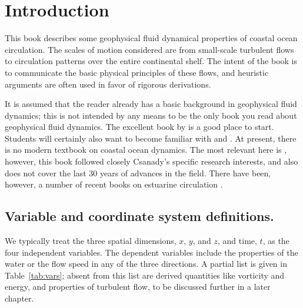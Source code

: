 \documentclass[11pt]{report}
\numberwithin{equation}{section}
\begin{document}
\clearpage

\setcounter{page}{1}

\chapter{Introduction}

This book describes some geophysical fluid dynamical properties of coastal ocean circulation.  The scales of motion considered are from small-scale turbulent flows to circulation patterns over the entire continental shelf.  The intent of the book is to communicate the basic physical principles of these flows, and heuristic arguments are often used in favor of rigorous derivations.

It is assumed that the reader already has a basic background in geophysical fluid dynamics; this is not intended by any means to be the only book you read about geophysical fluid dynamics.  The excellent book by \citet{cushman.beckers:09} is a good place to start.  Students will certainly also want to become familiar with \citet{pedlosky:87} and \citet{gill:82}.  At present, there is no modern textbook on coastal ocean dynamics.  The most relevant here is \citet{csanady:82}, however, this book followed closely Csanady's specific research interests, and also does not cover the last 30 years of advances in the field.  There have been, however, a number of recent books on estuarine circulation \citep{dyer:97, valle-levinson:10}.

\section{Variable and coordinate system definitions.}  

We typically treat the three spatial dimensions, $x$, $y$, and $z$, and time, $t$, as the four independent variables.  The dependent variables include the properties of the water or the flow speed in any of the three directions.  A partial list is given in Table~\ref{tab:vars}; absent from this list are derived quantities like vorticity and energy, and properties of turbulent flow, to be discussed further in a later chapter.
\end{document}
